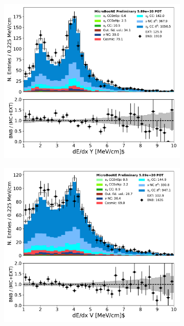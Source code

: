 \begin{figure}[H] 
\begin{center}
    \begin{subfigure}[b]{0.3\textwidth}
    \centering
    \includegraphics[width=1.00\textwidth]{pi0/calorimetry/shr_tkfit_dedx_Y_03112020_ALL_scaled.pdf}
    \caption{}
    \end{subfigure}
    \begin{subfigure}[b]{0.3\textwidth}
    \centering
    \includegraphics[width=1.00\textwidth]{pi0/calorimetry/shr_tkfit_dedx_V_03112020_ALL_scaled.pdf}

\end{subfigure}
\end{center}
\end{figure}
